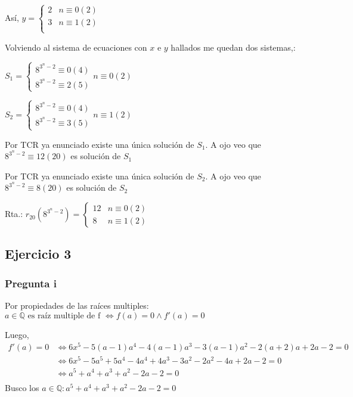 Así, $ y = \begin{cases}
    2 & n \equiv 0 (2) \\
    3 & n \equiv 1 (2) \\
\end{cases} $

Volviendo al sistema de ecuaciones con $x$ e $y$ hallados me quedan dos sistemas,:

$ S_1 = \begin{cases}
    8^{3^n-2} \equiv 0 (4) \\
    8^{3^n-2} \equiv 2 (5)
\end{cases} n \equiv 0(2)$

$ S_2 = \begin{cases}
    8^{3^n-2} \equiv 0 (4) \\
    8^{3^n-2} \equiv 3 (5)
\end{cases} n \equiv 1(2)$

Por TCR ya enunciado existe una única solución de $S_1$. A ojo veo que $ 8^{3^n-2} \equiv 12(20) $ es solución de $S_1$

Por TCR ya enunciado existe una única solución de $S_2$. A ojo veo que $ 8^{3^n-2} \equiv 8(20) $ es solución de $S_2$

Rta.: $ r_{20}(8^{3^n-2}) = \begin{cases}
    12 & n \equiv 0(2) \\
    8 & n \equiv 1(2)
\end{cases} $

\subsection{Ejercicio 3}

\subsubsection*{Pregunta i}

Por propiedades de las raíces multiples: $ a \in \mathbb{Q} \text{ es raíz multiple de f } \iff f(a) = 0 \wedge f'(a) = 0 $

Luego,
\begin{align*}
    f'(a) = 0 &\iff 6x^5 - 5(a-1)a^4 - 4(a-1)a^3 - 3(a-1)a^2 - 2(a+2)a + 2a - 2 = 0 \\
    &\iff 6x^5 - 5a^5 + 5a^4 - 4a^4 + 4a^3 - 3a^2 - 2a^2 - 4a + 2a - 2 = 0 \\
    &\iff a^5 + a^4 + a^3 + a^2 - 2a -2 = 0 \\
\end{align*}
Busco los $ a \in \mathbb{Q}: a^5 + a^4 + a^3 + a^2 - 2a -2 = 0 $

